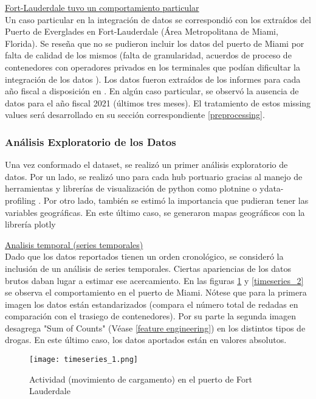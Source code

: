 \documentclass[12pt]{article}
\begin{document}
		\underline{Fort-Lauderdale tuvo un comportamiento particular}\\
		Un caso particular en la integración de datos se correspondió con los extraídos del Puerto de Everglades en Fort-Lauderdale (Área Metropolitana de Miami, Florida). Se reseña que no se pudieron incluir los datos del puerto de Miami por falta de calidad de los mismos (falta de granularidad, acuerdos de proceso de contenedores con operadores privados en los terminales que podían dificultar la integración de los datos \cite{}). Los datos fueron extraídos de los informes para cada año fiscal a disposición en \cite[]{}. En algún caso particular, se observó la ausencia de datos para el año fiscal 2021 (últimos tres meses). El tratamiento de estos missing values será desarrollado en su sección correspondiente \ref{preprocessing}.
		
		\subsubsection{\label{EDA}Análisis Exploratorio de los Datos}
		Una vez conformado el dataset, se realizó un primer análisis exploratorio de datos. Por un lado, se realizó uno para cada hub portuario gracias al manejo de herramientas y librerías de visualización de python como plotnine \cite{} o ydata-profiling \cite{}. Por otro lado, también se estimó la importancia que pudieran tener las variables geográficas. En este último caso, se generaron mapas geográficos con la librería plotly \cite{}

		\underline{Analisis temporal (series temporales)}\\
		Dado que los datos reportados tienen un orden cronológico, se consideró la inclusión de un análisis de series temporales. Ciertas apariencias de los datos brutos daban lugar a estimar ese acercamiento. En las figuras \ref{timeseries_1} y \ref{timeseries_2} se observa el comportamiento en el puerto de Miami. Nótese que para la primera imagen los datos están estandarizados (compara el número total de redadas en comparación con el trasiego de contenedores). Por su parte la segunda imagen desagrega "Sum of Counts" (Véase \ref{feature engineering}) en los distintos tipos de drogas. En este último caso, los datos aportados están en valores absolutos.
		\begin{figure}[H]
			\caption{\label{timeseries_1} Actividad (movimiento de cargamento) en el puerto de Fort Lauderdale}
			\centering
			\hspace*{1cm}
			\texttt{[image: timeseries\_1.png]}
		\end{figure}
	
\end{document}

